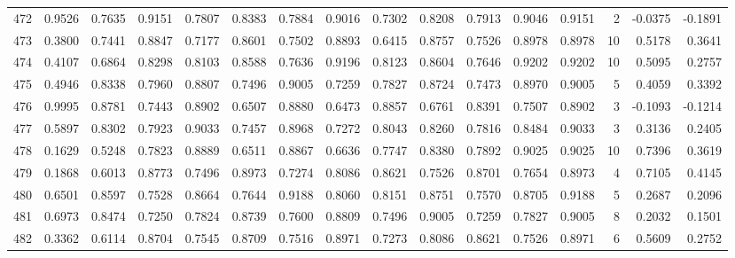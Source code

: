 \begin{tabular}{lrrrrrrrrrrrrrrr}
472 &      0.9526 &  0.7635 &  0.9151 &  0.7807 &  0.8383 &  0.7884 &  0.9016 &  0.7302 &  0.8208 &  0.7913 &   0.9046 &     0.9151 &      2 &                   -0.0375 &                    -0.1891 \\
473 &      0.3800 &  0.7441 &  0.8847 &  0.7177 &  0.8601 &  0.7502 &  0.8893 &  0.6415 &  0.8757 &  0.7526 &   0.8978 &     0.8978 &     10 &                    0.5178 &                     0.3641 \\
474 &      0.4107 &  0.6864 &  0.8298 &  0.8103 &  0.8588 &  0.7636 &  0.9196 &  0.8123 &  0.8604 &  0.7646 &   0.9202 &     0.9202 &     10 &                    0.5095 &                     0.2757 \\
475 &      0.4946 &  0.8338 &  0.7960 &  0.8807 &  0.7496 &  0.9005 &  0.7259 &  0.7827 &  0.8724 &  0.7473 &   0.8970 &     0.9005 &      5 &                    0.4059 &                     0.3392 \\
476 &      0.9995 &  0.8781 &  0.7443 &  0.8902 &  0.6507 &  0.8880 &  0.6473 &  0.8857 &  0.6761 &  0.8391 &   0.7507 &     0.8902 &      3 &                   -0.1093 &                    -0.1214 \\
477 &      0.5897 &  0.8302 &  0.7923 &  0.9033 &  0.7457 &  0.8968 &  0.7272 &  0.8043 &  0.8260 &  0.7816 &   0.8484 &     0.9033 &      3 &                    0.3136 &                     0.2405 \\
478 &      0.1629 &  0.5248 &  0.7823 &  0.8889 &  0.6511 &  0.8867 &  0.6636 &  0.7747 &  0.8380 &  0.7892 &   0.9025 &     0.9025 &     10 &                    0.7396 &                     0.3619 \\
479 &      0.1868 &  0.6013 &  0.8773 &  0.7496 &  0.8973 &  0.7274 &  0.8086 &  0.8621 &  0.7526 &  0.8701 &   0.7654 &     0.8973 &      4 &                    0.7105 &                     0.4145 \\
480 &      0.6501 &  0.8597 &  0.7528 &  0.8664 &  0.7644 &  0.9188 &  0.8060 &  0.8151 &  0.8751 &  0.7570 &   0.8705 &     0.9188 &      5 &                    0.2687 &                     0.2096 \\
481 &      0.6973 &  0.8474 &  0.7250 &  0.7824 &  0.8739 &  0.7600 &  0.8809 &  0.7496 &  0.9005 &  0.7259 &   0.7827 &     0.9005 &      8 &                    0.2032 &                     0.1501 \\
482 &      0.3362 &  0.6114 &  0.8704 &  0.7545 &  0.8709 &  0.7516 &  0.8971 &  0.7273 &  0.8086 &  0.8621 &   0.7526 &     0.8971 &      6 &                    0.5609 &                     0.2752 \\

\end{tabular}
